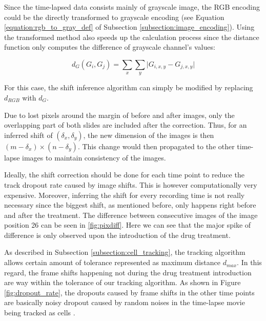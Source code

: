 \documentclass[pdftex,12pt,a4paper]{report}
\begin{document}
\vspace{10mm}

Since the time-lapsed data consists mainly of grayscale image, the RGB encoding could be the directly transformed to grayscale encoding (see Equation \ref{equation:rgb_to_gray_def} of Subsection \ref{subsection:image_encoding}). Using the transformed method also speeds up the calculation process since the distance function only computes the difference of grayscale channel's values:

$$
d_G(G_i, G_j) =  \sum_{x} \sum_{y} \vert G_{i, x, y} - G_{j, x, y}\vert
$$

For this case, the shift inference algorithm can simply be modified by replacing $d_{RGB}$ with $d_G$.

Due to lost pixels around the margin of before and after images, only the overlapping part of both slides are included after the correction. Thus, for an inferred shift of $(\delta_x, \delta_y)$, the new dimension of the images is then $(m - \delta_x) \times (n - \delta_y)$. This change would then propagated to the other time-lapse images to maintain consistency of the images.

Ideally, the shift correction should be done for each time point to reduce the track dropout rate caused by image shifts. This is however computationally very expensive. Moreover, inferring the shift for every recording time is not really necessary since the biggest shift, as mentioned before, only happens right before and after the treatment. The difference between consecutive images of the image position 26 can be seen in \ref{fig:pixdiff}. Here we can see that the major spike of difference is only observed upon the introduction of the drug treatment.

As described in Subsection \ref{subsection:cell_tracking}, the tracking algorithm allows certain amount of tolerance represented as maximum distance $d_{max}$. In this regard, the frame shifts happening not during the drug treatment introduction are way within the tolerance of our tracking algorithm. As shown in Figure \ref{fig:dropout_rate}, the dropouts caused by frame shifts in the other time points are basically noisy dropout caused by random noises in the time-lapse movie being tracked as cells \cite{jaqaman2008robust}.
\end{document}
